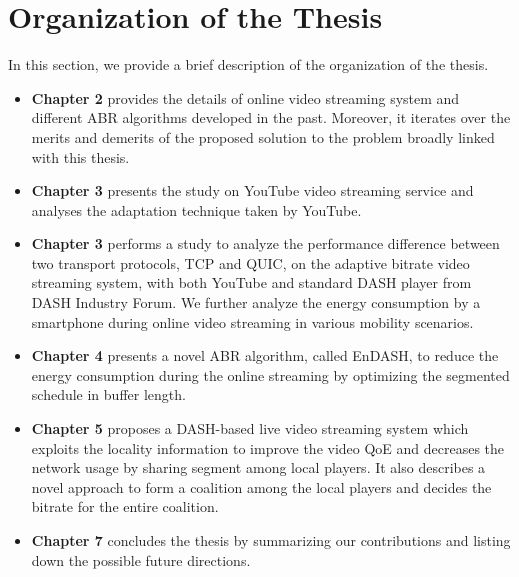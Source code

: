 \section{Organization of the Thesis}

In this section, we provide a brief description of the organization of the thesis.
\begin{itemize}
	\item {\bf Chapter 2} provides the details of online video streaming system and different ABR algorithms developed in the past. Moreover, it iterates over the merits and demerits of the proposed solution to the problem broadly linked with this thesis.
	\item {\bf Chapter 3} presents the study on YouTube video streaming service and analyses the adaptation technique taken by YouTube.
	\item {\bf Chapter 3} performs a study to analyze the performance difference between two transport protocols, TCP and QUIC, on the adaptive bitrate video streaming system, with both YouTube and standard DASH player from DASH Industry Forum. We further analyze the energy consumption by a smartphone during online video streaming in various mobility scenarios.
	\item {\bf Chapter 4} presents a novel ABR algorithm, called EnDASH, to reduce the energy consumption during the online streaming by optimizing the segmented schedule in buffer length.
	\item {\bf Chapter 5} proposes a DASH-based live video streaming system which exploits the locality information to improve the video QoE and decreases the network usage by sharing segment among local players. It also describes a novel approach to form a coalition among the local players and decides the bitrate for the entire coalition.
	\item {\bf Chapter 7} concludes the thesis by summarizing our contributions and listing down the possible future directions.
\end{itemize}